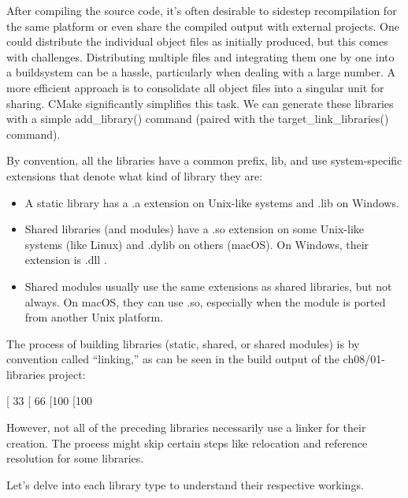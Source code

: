 
After compiling the source code, it’s often desirable to sidestep recompilation for the same platform or even share the compiled output with external projects. One could distribute the individual object files as initially produced, but this comes with challenges. Distributing multiple files and integrating them one by one into a buildsystem can be a hassle, particularly when dealing with a large number. A more efficient approach is to consolidate all object files into a singular unit for sharing. CMake significantly simplifies this task. We can generate these libraries with a simple add\_library() command (paired with the target\_link\_libraries() command).

By convention, all the libraries have a common prefix, lib, and use system-specific extensions that denote what kind of library they are:

\begin{itemize}
\item
A static library has a .a extension on Unix-like systems and .lib on Windows.

\item
Shared libraries (and modules) have a .so extension on some Unix-like systems (like Linux) and .dylib on others (macOS). On Windows, their extension is .dll .

\item
Shared modules usually use the same extensions as shared libraries, but not always. On macOS, they can use .so, especially when the module is ported from another Unix platform.
\end{itemize}

The process of building libraries (static, shared, or shared modules) is by convention called “linking,” as can be seen in the build output of the ch08/01-libraries project:

\begin{shell}
[ 33%
[ 66%
[100%
[100%
\end{shell}

However, not all of the preceding libraries necessarily use a linker for their creation. The process might skip certain steps like relocation and reference resolution for some libraries.

Let’s delve into each library type to understand their respective workings.


